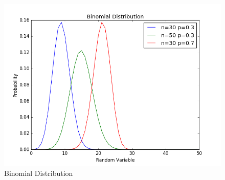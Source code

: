 \documentclass{article}
\begin{document}
\begin{enumerate}
\begin{figure}[!htb]
{\begin{minipage}{0.5\textwidth}
                    \includegraphics[width=\textwidth,height=\textheight,keepaspectratio]{binomial}
                    \caption{Binomial Distribution}
                    \label{fig:BinomialDistribution}
                \end{minipage}%
                }
            \end{figure}
            \begin{figure}[!htb]
\end{figure}
\end{enumerate}
\end{document}
